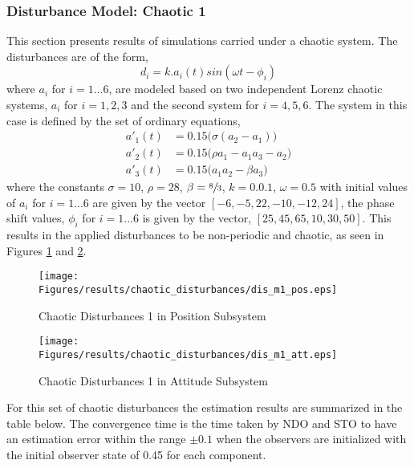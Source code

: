 \documentclass{article}
\begin{document}
\subsubsection{Disturbance Model: Chaotic 1}
This section presents results of simulations carried under a chaotic system. The disturbances are of the form,
\begin{equation}
d_i = k.a_i(t)sin(\omega t-\phi_i)
\label{eq:dist_1}
\end{equation}
where $a_i$ for $i=1...6$, are modeled based on two independent Lorenz chaotic systems, $a_i$ for $i=1,2,3$ and the second system for $i=4,5,6$. The system in this case is defined by the set of ordinary equations, 
\begin{subequations}
\begin{align}
a'_1(t) &= 0.15\big(\sigma(a_2-a_1)\big)\\
a'_2(t) &= 0.15\big(\rho a_1 - a_1 a_3 - a_2\big)\\
a'_3(t) &= 0.15\big(a_1 a_2 - \beta a_3\big)
\end{align}
\end{subequations}
where the constants $\sigma=10$, $\rho=28$, $\beta=\sfrac{8}{3}$, $k=0.0.1$, $\omega=0.5$ with initial values of $a_i$ for $i=1...6$ are given by the vector $[-6,-5,22,-10,-12,24]$, the phase shift values, $\phi_i$ for $i=1...6$ is given by the vector, $[25,45,65,10,30,50]$. This results in the applied disturbances to be non-periodic and chaotic, as seen in Figures \ref{dis_m1_pos} and \ref{dis_m1_att}.

\begin{figure}[H]
\centering
\texttt{[image: Figures/results/chaotic\_disturbances/dis\_m1\_pos.eps]}
\caption{Chaotic Disturbances 1 in Position Subsystem}
\label{dis_m1_pos}
\end{figure}

\begin{figure}[H]
\centering
\texttt{[image: Figures/results/chaotic\_disturbances/dis\_m1\_att.eps]}
\caption{Chaotic Disturbances 1 in Attitude Subsystem}
\label{dis_m1_att}
\end{figure}


For this set of chaotic disturbances the estimation results are summarized in the table below. The convergence time is the time taken by NDO and STO to have an estimation error within the range $\pm0.1$ when the observers are initialized with the initial observer state of 0.45 for each component. 
\end{document}
